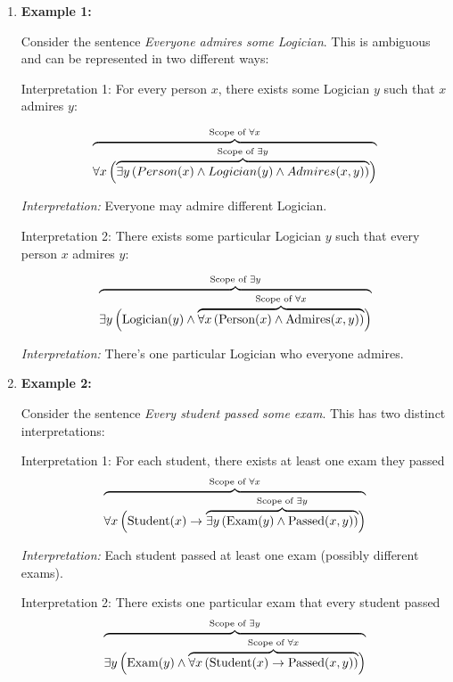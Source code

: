 \documentclass[12pt,a4paper,openany]{article}
\begin{document}
\begin{enumerate}
\def\labelenumi{\arabic{enumi}.}
\item
  \textbf{Example 1:} 

  Consider the sentence \emph{Everyone admires some Logician}. This is
  ambiguous and can be represented in two different ways:

  Interpretation 1: For every person \(x\), there exists some Logician
  \(y\) such that \(x\) admires \(y\):

  \[
   {\color{black}\overbrace{\color{black}\forall x \, \Big(
   {\color{black}\overbrace{\color{black}\exists y \, (Person(x) \wedge Logician(y) \wedge Admires(x,y))}^{\color{black}\text{Scope of } \exists y}}
   \Big)}^{\color{black}\text{Scope of } \forall x}}
   \]

  \emph{Interpretation:} Everyone may admire different Logician.

  Interpretation 2: There exists some particular Logician \(y\) such
  that every person \(x\) admires \(y\):

  \[
   {\color{black}\overbrace{\color{black}\exists y \,
   \Big(
   \text{Logician}(y) \wedge
   {\color{black}\overbrace{\color{black}\forall x \,
   ( \text{Person}(x) \wedge \text{Admires}(x,y) )
   }^{\color{black}\text{Scope of } \forall x}}
   \Big)
   }^{\color{black}\text{Scope of } \exists y}}
   \]

  \emph{Interpretation:} There's one particular Logician who everyone
  admires.
\item
  \textbf{Example 2:}

  Consider the sentence \emph{Every student passed some exam}. This has
  two distinct interpretations:

  Interpretation 1: For each student, there exists at least one exam
  they passed \[
   {\color{black}\overbrace{\color{black}\forall x \, \Big(
   \text{Student}(x) \to
   {\color{black}\overbrace{\color{black}\exists y \, (\text{Exam}(y) \wedge \text{Passed}(x,y))}^{\color{black}\text{Scope of } \exists y}}
   \Big)}^{\color{black}\text{Scope of } \forall x}}
   \]

  \emph{Interpretation:} Each student passed at least one exam (possibly
  different exams).

  Interpretation 2: There exists one particular exam that every student
  passed \[
   {\color{black}\overbrace{\color{black}\exists y \,
   \Big(
   \text{Exam}(y) \wedge
   {\color{black}\overbrace{\color{black}\forall x \, 
   ( \text{Student}(x) \to \text{Passed}(x,y) )
   }^{\color{black}\text{Scope of } \forall x}}
   \Big)
   }^{\color{black}\text{Scope of } \exists y}}
   \]


\end{enumerate}
\end{document}
